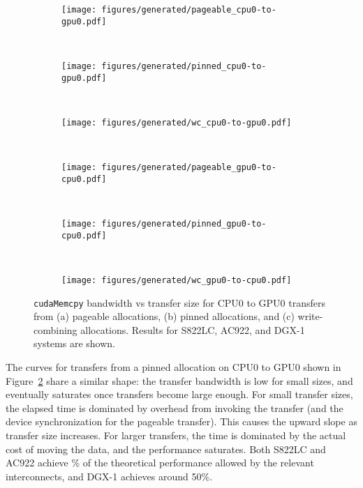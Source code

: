 \begin{figure}[H]
	\centering
	\begin{subfigure}[b]{0.3\textwidth}
		\texttt{[image: figures/generated/pageable\_cpu0-to-gpu0.pdf]}
		\caption{}
		\label{fig:pageable-cpu0-gpu0}
	\end{subfigure}
	~
	\begin{subfigure}[b]{0.3\textwidth}
		\texttt{[image: figures/generated/pinned\_cpu0-to-gpu0.pdf]}
		\caption{}
		\label{fig:pinned-cpu0-gpu0}
	\end{subfigure}
	~
	\begin{subfigure}[b]{0.3\textwidth}
		\texttt{[image: figures/generated/wc\_cpu0-to-gpu0.pdf]}
		\caption{}
		\label{fig:wc-cpu0-gpu0}
	\end{subfigure}
	\\
	\begin{subfigure}[b]{0.3\textwidth}
		\texttt{[image: figures/generated/pageable\_gpu0-to-cpu0.pdf]}
		\caption{}
		\label{fig:pageable-gpu0-cpu0}
	\end{subfigure}
	~
	\begin{subfigure}[b]{0.3\textwidth}
		\texttt{[image: figures/generated/pinned\_gpu0-to-cpu0.pdf]}
		\caption{}
		\label{fig:pinned-gpu0-cpu0}
	\end{subfigure}
	~
	\begin{subfigure}[b]{0.3\textwidth}
		\texttt{[image: figures/generated/wc\_gpu0-to-cpu0.pdf]}
		\caption{}
		\label{fig:wc-gpu0-cpu0}
	\end{subfigure}
	\caption[\texttt{cudaMemcpy} bandwidth for CPU0-GPU0 transfers.]{
		\texttt{cudaMemcpy} bandwidth vs transfer size for CPU0 to GPU0 transfers from 
		(a) pageable allocations,
		(b) pinned allocations, and
		(c) write-combining allocations.
		Results for S822LC, AC922, and DGX-1 systems are shown.
	}
	\label{fig:pageable-pinned-wc}
\end{figure}


The curves for transfers from a pinned allocation on CPU0 to GPU0 shown in Figure~\ref{fig:pinned-cpu0-gpu0} share a similar shape: the transfer bandwidth is low for small sizes, and eventually saturates once transfers become large enough.
For small transfer sizes, the elapsed time is dominated by overhead from invoking the transfer (and the device synchronization for the pageable transfer).
This causes the upward slope as transfer size increases.
For larger transfers, the time is dominated by the actual cost of moving the data, and the performance saturates.
Both S822LC and AC922 achieve \% of the theoretical performance allowed by the relevant interconnects, and DGX-1 achieves around 50\%.

